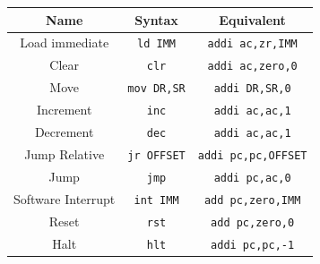 \begin{center}
    \begin{tabular}{|c|c|c|}
        \hline
        Name & Syntax & Equivalent \\
        \hline
        Load immediate & \verb|ld IMM| & \verb|addi ac,zr,IMM| \\
        \hline
        Clear & \verb|clr| & \verb|addi ac,zero,0| \\
        \hline
        Move & \verb|mov DR,SR| & \verb|addi DR,SR,0| \\
        \hline
        Increment & \verb|inc| & \verb|addi ac,ac,1|  \\
        \hline
        Decrement & \verb|dec| & \verb|addi ac,ac,1| \\
        \hline
        Jump Relative & \verb|jr OFFSET| & \verb|addi pc,pc,OFFSET| \\
        \hline
        Jump & \verb|jmp| & \verb|addi pc,ac,0| \\
        \hline
        Software Interrupt & \verb|int IMM| & \verb|add pc,zero,IMM| \\
        \hline
        Reset & \verb|rst| & \verb|add pc,zero,0| \\
        \hline
        Halt & \verb|hlt| & \verb|addi pc,pc,-1| \\
        \hline
    \end{tabular}
\end{center}

